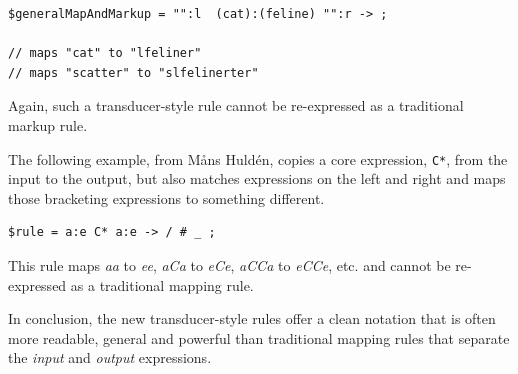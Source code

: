\begin{Verbatim}
$generalMapAndMarkup = "":l  (cat):(feline) "":r -> ;

// maps "cat" to "lfeliner"
// maps "scatter" to "slfelinerter"
\end{Verbatim}

\noindent
Again, such a transducer-style rule cannot be re-expressed as a traditional markup rule.

The following example, from M\r{a}ns Huldén, copies a core expression, \verb!C*!, from the
input to the output, but also matches expressions on the left and right and maps those
bracketing expressions to something different.

\begin{Verbatim}
$rule = a:e C* a:e -> / # _ ;
\end{Verbatim}

\noindent
This rule maps \emph{aa} to \emph{ee}, \emph{aCa} to \emph{eCe}, \emph{aCCa}
to \emph{eCCe}, etc. and cannot be re-expressed as a traditional mapping rule.

In conclusion, the new transducer-style rules offer a clean notation that is often more
readable, general and powerful than traditional mapping rules that separate the \emph{input}
and \emph{output} expressions.  
